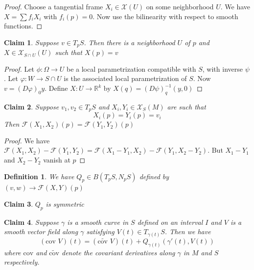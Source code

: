 \documentclass[a4paper,11pt]{article}
\newtheorem{definition}{Definition}
\newtheorem{claim}{Claim}
\begin{document}
\begin{proof}
  Choose a tangential frame $X_i \in \mathcal{X}(U)$ on some neighborhood $U$. We have $X=\sum f_iX_i$ with $f_i(p)=0$. Now use the bilinearity with respect to smooth functions.
\end{proof}

\begin{claim}
  Suppose $v \in T_pS$. Then there is a neighborhood $U$ of $p$ and $X \in \mathcal{X}_{S \cap U}(U)$ such that $X(p)=v$
\end{claim}

\begin{proof} 
  Let $\phi:\Omega \to U$ be a local parametrization compatible with $S$, with inverse $\psi$. 
  Let $\varphi:W \to S \cap U$ is the associated local parametrization of $S$. 
  Now $v=(D\varphi)_0y$. Define $X: U \to \mathbb{R}^k$ by $X(q)=(D\psi)_q^{-1}(y,0)$
\end{proof}

\begin{claim}
  Suppose $v_1,v_2 \in T_pS$ and $X_i,Y_i \in \mathcal{X}_S(M)$ are such that \[X_i(p)=Y_i(p)=v_i\]
  Then $\mathcal{F}(X_1,X_2)(p)=\mathcal{F}(Y_1,Y_2)(p)$
\end{claim}

\begin{proof}
  We have $\mathcal{F}(X_1,X_2)-\mathcal{F}(Y_1,Y_2)=\mathcal{F}(X_1-Y_1,X_2)-\mathcal{F}(Y_1,X_2-Y_2)$. But $X_1-Y_1$ and $X_2-Y_2$ vanish at $p$
\end{proof}

\begin{definition}
  We have $Q_p \in B(T_pS,N_pS)$ defined by $(v,w) \to \mathcal{F}(X,Y)(p)$
\end{definition}

\begin{claim}
  $Q_p$ is symmetric
\end{claim}

\begin{claim}\label{relatingCov}
  Suppose $\gamma$ is a smooth curve in $S$ defined on an interval $I$ and $V$ is a smooth vector field along $\gamma$ satisfying $V(t) \in T_{\gamma(t)}S$.
  Then we have \[(\text{cov }V)(t)=(\widetilde{\text{cov }}V)(t)+Q_{\gamma(t)}(\gamma'(t),V(t))\]
  where $\text{cov}$ and $\widetilde{\text{cov}}$ denote the covariant derivatives along $\gamma$ in $M$ and $S$ respectively. 
\end{claim}
\end{document}
